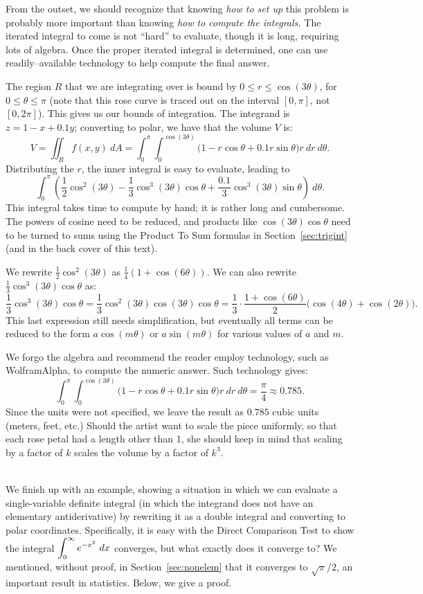 {From the outset, we should recognize that knowing \textit{how to set up} this problem is probably more important than knowing \textit{how to compute the integrals.} The iterated integral to come is not ``hard'' to evaluate, though it is long, requiring lots of algebra. Once the proper iterated integral is determined, one can use readily--available technology to help  compute the final answer. 

The region $R$ that we are integrating over is bound by $0\leq r\leq \cos(3\theta)$, for $0\leq \theta\leq\pi$ (note that this rose curve is traced out on the interval $[0,\pi]$, not $[0,2\pi]$). This gives us our bounds of integration. The integrand is $z=1-x+0.1y$; converting to polar, we have that the volume $V$ is:
$$V = \iint_R f(x,y)\ dA = \int_0^\pi\int_0^{\cos(3\theta)}\big(1-r\cos\theta+0.1r\sin\theta\big)r\ dr\ d\theta.$$
Distributing the $r$, the inner integral is easy to evaluate, leading to 
$$ \int_0^\pi \left(\frac12\cos^2(3\theta)-\frac13\cos^3(3\theta)\cos\theta+\frac{0.1}3\cos^3(3\theta)\sin\theta\right)\ d\theta.$$
This integral takes time to compute by hand; it is rather long and cumbersome. The powers of cosine need to be reduced, and products like $\cos(3\theta)\cos\theta$ need to be turned to sums using the Product To Sum formulas in Section~\ref{sec:trigint} (and in the back cover of this text). 

We rewrite $\frac12\cos^2(3\theta)$ as $\frac14(1+\cos(6\theta))$. We can also rewrite $\frac13\cos^3(3\theta)\cos\theta$ as: 
$$\frac13\cos^3(3\theta)\cos\theta = \frac13\cos^2(3\theta)\cos(3\theta)\cos\theta = \frac13\cdot\frac{1+\cos(6\theta)}2\big(\cos(4\theta)+\cos(2\theta)\big).$$
This last expression still needs simplification, but eventually all terms can be reduced to the form $a\cos(m\theta)$ or $a\sin(m\theta)$ for various values of $a$ and $m$.

We forgo the algebra and recommend the reader employ technology, such as WolframAlpha\textregistered, to compute the numeric answer. Such technology gives:
$$\int_0^\pi\int_0^{\cos(3\theta)}\big(1-r\cos\theta+0.1r\sin\theta\big)r\ dr\ d\theta = \frac{\pi}{4} \approx 0.785.$$
Since the units were not specified, we leave the result as $0.785$ cubic units (meters, feet, etc.) Should the artist want to scale the piece uniformly, so that each rose petal had a length other than 1, she should keep in mind that scaling by a factor of $k$ scales the volume by a factor of $k^3$. 
}\\

We finish up with an example, showing a situation in which we can evaluate a single-variable definite integral (in which the integrand does not have an elementary antiderivative) by rewriting it as a double integral and converting to polar coordinates.  Specifically, it is easy with the Direct Comparison Test to show the integral $\displaystyle \int_0^{\infty} e^{-x^2}\ dx$ converges, but what exactly does it converge to?  We mentioned, without proof, in Section~\ref{sec:nonelem} that it converges to $\sqrt{\pi}/2$, an important result in statistics.  Below, we give a proof.\\

